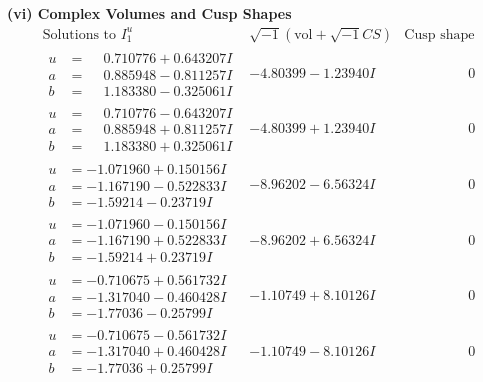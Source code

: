 \documentclass[1p]{elsarticle_modified}
\theoremstyle{definition}
\newcommand{\I}{\sqrt{-1}}
\begin{document}
\newpage\flushleft \textbf{(vi) Complex Volumes and Cusp Shapes}
$$\begin{array}{c|c|c}  
\text{Solutions to }I^u_{1}& \I (\text{vol} + \sqrt{-1}CS) & \text{Cusp shape}\\
 \hline 
\begin{aligned}
u &= \phantom{-}0.710776 + 0.643207 I \\
a &= \phantom{-}0.885948 - 0.811257 I \\
b &= \phantom{-}1.183380 - 0.325061 I\end{aligned}
 & -4.80399 - 1.23940 I & \phantom{-0.000000 } 0 \\ \hline\begin{aligned}
u &= \phantom{-}0.710776 - 0.643207 I \\
a &= \phantom{-}0.885948 + 0.811257 I \\
b &= \phantom{-}1.183380 + 0.325061 I\end{aligned}
 & -4.80399 + 1.23940 I & \phantom{-0.000000 } 0 \\ \hline\begin{aligned}
u &= -1.071960 + 0.150156 I \\
a &= -1.167190 - 0.522833 I \\
b &= -1.59214 - 0.23719 I\end{aligned}
 & -8.96202 - 6.56324 I & \phantom{-0.000000 } 0 \\ \hline\begin{aligned}
u &= -1.071960 - 0.150156 I \\
a &= -1.167190 + 0.522833 I \\
b &= -1.59214 + 0.23719 I\end{aligned}
 & -8.96202 + 6.56324 I & \phantom{-0.000000 } 0 \\ \hline\begin{aligned}
u &= -0.710675 + 0.561732 I \\
a &= -1.317040 - 0.460428 I \\
b &= -1.77036 - 0.25799 I\end{aligned}
 & -1.10749 + 8.10126 I & \phantom{-0.000000 } 0 \\ \hline\begin{aligned}
u &= -0.710675 - 0.561732 I \\
a &= -1.317040 + 0.460428 I \\
b &= -1.77036 + 0.25799 I\end{aligned}
 & -1.10749 - 8.10126 I & \phantom{-0.000000 } 0 \\ \hline\begin{aligned}

\end{aligned}
\end{array}$$
\end{document}
